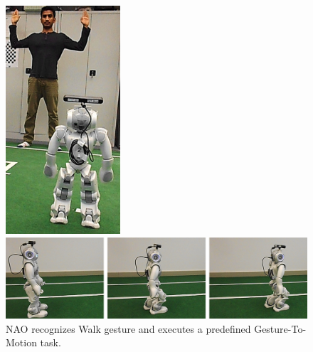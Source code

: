 \begin{figure}
	[h] 
	\begin{minipage}
		{1 
		\textwidth} \centering 
		\includegraphics[height=85mm]{figures/result/usr-walk.jpg} \caption*{} 
	\end{minipage}
	\begin{minipage}
		{1 
		\textwidth} \hspace{-5 mm} 
		\includegraphics[width=160mm]{figures/result/nao-gm-walk.jpg} \caption*{} 
	\end{minipage}
	\caption{NAO recognizes Walk gesture and executes a predefined Gesture-To-Motion task.} \label{res:gm:walk} 
\end{figure}
